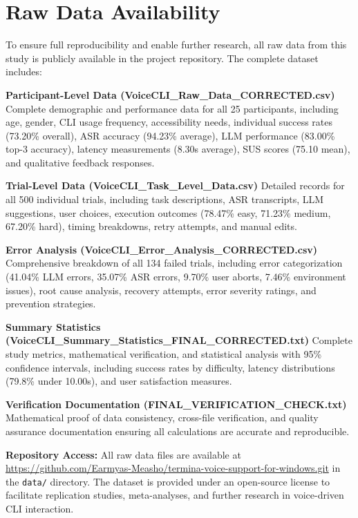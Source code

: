 \documentclass[a4paper,12pt]{article}
\begin{document}
\clearpage

\section*{Raw Data Availability}
\noindent To ensure full reproducibility and enable further research, all raw data from this study is publicly available in the project repository. The complete dataset includes:

\textbf{Participant-Level Data (VoiceCLI\_Raw\_Data\_CORRECTED.csv)} Complete demographic and performance data for all 25 participants, including age, gender, CLI usage frequency, accessibility needs, individual success rates (73.20\% overall), ASR accuracy (94.23\% average), LLM performance (83.00\% top-3 accuracy), latency measurements (8.30s average), SUS scores (75.10 mean), and qualitative feedback responses.

\textbf{Trial-Level Data (VoiceCLI\_Task\_Level\_Data.csv)} Detailed records for all 500 individual trials, including task descriptions, ASR transcripts, LLM suggestions, user choices, execution outcomes (78.47\% easy, 71.23\% medium, 67.20\% hard), timing breakdowns, retry attempts, and manual edits.

\textbf{Error Analysis (VoiceCLI\_Error\_Analysis\_CORRECTED.csv)} Comprehensive breakdown of all 134 failed trials, including error categorization (41.04\% LLM errors, 35.07\% ASR errors, 9.70\% user aborts, 7.46\% environment issues), root cause analysis, recovery attempts, error severity ratings, and prevention strategies.

\textbf{Summary Statistics (VoiceCLI\_Summary\_Statistics\_FINAL\_CORRECTED.txt)} Complete study metrics, mathematical verification, and statistical analysis with 95\% confidence intervals, including success rates by difficulty, latency distributions (79.8\% under 10.00s), and user satisfaction measures.

\textbf{Verification Documentation (FINAL\_VERIFICATION\_CHECK.txt)} Mathematical proof of data consistency, cross-file verification, and quality assurance documentation ensuring all calculations are accurate and reproducible.

\textbf{Repository Access:} All raw data files are available at \url{https://github.com/Earmyas-Measho/termina-voice-support-for-windows.git} in the \texttt{data/} directory. The dataset is provided under an open-source license to facilitate replication studies, meta-analyses, and further research in voice-driven CLI interaction.
\end{document}
